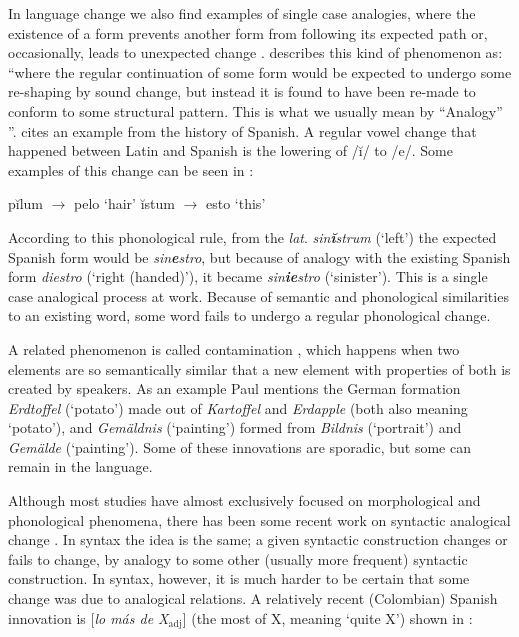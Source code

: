 In language change we also find examples of single case analogies, where the existence of a form prevents another form from following its expected path or, occasionally, leads to unexpected change \autocite{Bauer.2003}. \textcite[276]{Anderson.2015} describes this kind of phenomenon as: ``where the regular continuation of some form would be expected to undergo some re-shaping by sound change, but instead it is found to have been re-made to conform to some structural pattern. This is what we usually mean by ``Analogy'' ''. \textcite{Rainer.2013} cites an example from the history of Spanish. A regular vowel change that happened between Latin and Spanish is the lowering of /ĭ/ to /e/. Some examples of this change can be seen in :


\begin{exe}
    \ex \label{exe-change-lat}
    \begin{xlist}
        \ex pĭlum $\rightarrow$ pelo `hair'
        \ex ĭstum $\rightarrow$ esto `this'
    \end{xlist}
\end{exe}

According to this phonological rule, from the \textit{lat}. \textit{sin\textbf{ĭ}strum} (`left') the expected Spanish form would be \textit{sin\textbf{e}stro}, but because of analogy with the existing Spanish form \textit{diestro} (`right (handed)'), it became \textit{sin\textbf{ie}stro} (`sinister'). This is a single case analogical process at work. Because of semantic and phonological similarities to an existing word, some word fails to undergo a regular phonological change.

A  related phenomenon is called contamination \autocite[160]{Paul.1995}, which happens when two elements are so semantically similar that a new element with properties of both is created by speakers. As an example Paul mentions the German formation \textit{Erdtoffel} (`potato') made out of \textit{Kartoffel} and \textit{Erdapple} (both also meaning `potato'), and \textit{Gemäldnis} (`painting') formed from \textit{Bildnis} (`portrait') and \textit{Gemälde} (`painting'). Some of these innovations are sporadic, but some can remain in the language.

Although most studies have almost exclusively focused on morphological and phonological phenomena, there has been some recent work on syntactic analogical change \autocite{DeSmet.2016}. In syntax the idea is the same; a given syntactic construction changes or fails to change, by analogy to some other (usually more frequent) syntactic construction. In syntax, however, it is much harder to be certain that some change was due to analogical relations. A relatively recent (Colombian) Spanish innovation is [\textit{lo más de X$_{\text{adj}}$}] (the most of X, meaning `quite X') shown in :

